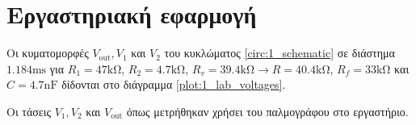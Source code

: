 \section{Εργαστηριακή εφαρμογή}

	Οι κυματομορφές $V_{\mathrm{out}}, V_1$ και $V_2$ του κυκλώματος \ref{circ:1_schematic} σε διάστημα  $1.184\unit{\milli\second}$ για $R_1=47\unit{\kilo\ohm}$, $R_2=4.7\unit{\kilo\ohm}$, $R_v=39.4\unit{\kilo\ohm}\rightarrow R=40.4\unit{\kilo\ohm}$, $R_f=33\unit{\kilo\ohm}$ και $C=4.7\unit{\nano\farad}$ δίδονται στο διάγραμμα \ref{plot:1_lab_voltages}.

	\begin{chart}[H]
		\begin{center}
			
			\caption{Οι τάσεις $V_1, V_2$ και $V_{\mathrm{out}}$ όπως μετρήθηκαν χρήσει του παλμογράφου στο εργαστήριο.}
			\label{plot:1_lab_voltages}
		\end{center}
	\end{chart}